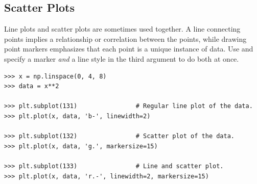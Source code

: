 %

\subsection*{Scatter Plots} %

Line plots and scatter plots are sometimes used together.
A line connecting points implies a relationship or correlation between the points, while drawing point markers emphasizes that each point is a unique instance of data.
Use  and specify a marker \emph{and} a line style in the third argument to do both at once.

\begin{lstlisting}
>>> x = np.linspace(0, 4, 8)
>>> data = x**2

>>> plt.subplot(131)                # Regular line plot of the data.
>>> plt.plot(x, data, 'b-', linewidth=2)

>>> plt.subplot(132)                # Scatter plot of the data.
>>> plt.plot(x, data, 'g.', markersize=15)

>>> plt.subplot(133)                # Line and scatter plot.
>>> plt.plot(x, data, 'r.-', linewidth=2, markersize=15)
\end{lstlisting}

